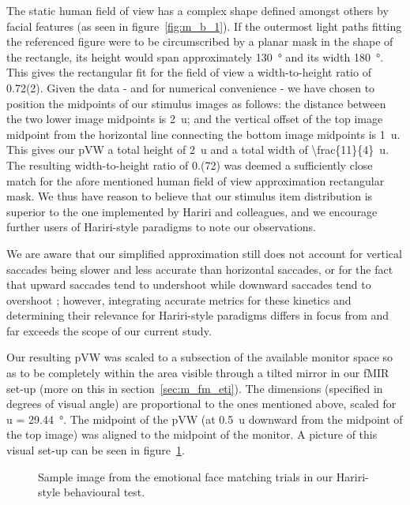     The static human field of view has a complex shape defined amongst others by facial features (as seen in figure~\ref{fig:m_b_1}).
    If the outermost light paths fitting the referenced figure were to be circumscribed by a planar mask in the shape of the rectangle, its height would span approximately \SI{130}{\degree} and its width \SI{180}{\degree}.
    This gives the rectangular fit for the field of view a width-to-height ratio of 0.72(2).
    Given the data - and for numerical convenience - we have chosen to position the midpoints of our stimulus images as follows: 
    the distance between the two lower image midpoints is \SI{2}{u}; and the vertical offset of the top image midpoint from the horizontal line connecting the bottom image midpoints is \SI{1}{u}.
    This gives our pVW a total height of \SI{2}{u} and a total width of \SI[parse-numbers = false]{\frac{11}{4}}{u}.
    The resulting width-to-height ratio of 0.(72) was deemed a sufficiently close match for the afore mentioned human field of view approximation rectangular mask.
    We thus have reason to believe that our stimulus item distribution is superior to the one implemented by Hariri and colleagues, and we encourage further users of Hariri-style paradigms to note our observations.  
    
    We are aware that our simplified approximation still does not account for vertical saccades being slower\cite{TerryBahill1975} and less accurate\cite{Collewijn1988} than horizontal saccades, or for the fact that upward saccades tend to undershoot while downward saccades tend to overshoot \cite{Collewijn1988};
    however, integrating accurate metrics for these kinetics and determining their relevance for Hariri-style paradigms differs in focus from and far exceeds the scope of our current study.
    
    Our resulting pVW was scaled to a subsection of the available monitor space so as to be completely within the area visible through a tilted mirror in our fMIR set-up (more on this in section~\ref{sec:m_fm_eti}).
    The dimensions (specified in degrees of visual angle) are proportional to the ones mentioned above, scaled for u = \SI{29.44}{\degree}.
    The midpoint of the pVW (at \SI{0.5}{u} downward from the midpoint of the top image) was aligned to the midpoint of the monitor.
    A picture of this visual set-up can be seen in figure~\ref{fig:m_b_2}.
    
    \begin{figure}[!h]
	\caption{Sample image from the emotional face matching trials in our Hariri-style behavioural test.}
	\label{fig:m_b_2}
    \end{figure}
		
